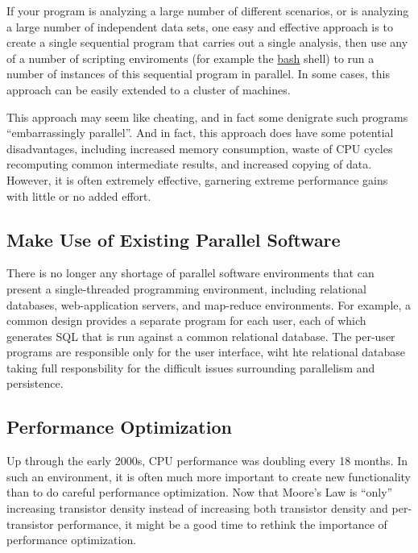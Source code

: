 If your program is analyzing a large number of different scenarios,
or is analyzing a large number of independent data sets, one easy
and effective approach is to create a single sequential program that
carries out a single analysis, then use any of a number of scripting
enviroments (for example the \url{bash} shell) to run a number of
instances of this sequential program in parallel.
In some cases, this approach can be easily extended to a cluster of
machines.

This approach may seem like cheating, and in fact some denigrate such
programs ``embarrassingly parallel''.
And in fact, this approach does have some potential disadvantages,
including increased memory consumption, waste of CPU cycles recomputing
common intermediate results, and increased copying of data.
However, it is often  extremely effective, garnering extreme performance
gains with little or no added effort.

\subsection{Make Use of Existing Parallel Software}
\label{sec:intro:Make Use of Existing Parallel Software}

There is no longer any shortage of parallel software environments that
can present a single-threaded programming environment,
including relational
databases, web-application servers, and map-reduce environments.
For example, a common design provides a separate program for each
user, each of which generates SQL that is run against a common
relational database.
The per-user programs are responsible only for the user interface,
wiht hte relational database taking full responsbility for the
difficult issues surrounding parallelism and persistence.

\subsection{Performance Optimization}
\label{sec:intro:Performance Optimization}

Up through the early 2000s, CPU performance was doubling every 18 months.
In such an environment, it is often much more important to create new
functionality than to do careful performance optimization.
Now that Moore's Law is ``only'' increasing transistor density instead
of increasing both transistor density and per-transistor performance,
it might be a good time to rethink the importance of performance
optimization.

